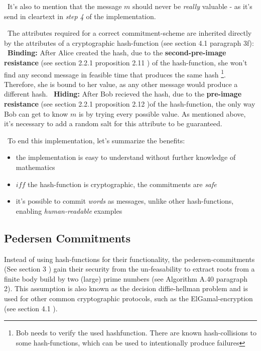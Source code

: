 ~\newline It's also to mention that the message $m$ should never be \textit{really} valuable - as it's send in cleartext in \textit{step 4} of the implementation.  

~\newline The attributes required for a correct commitment-scheme are inherited directly by the attributes of a cryptographic hash-function (see \cite{Mironov05} section 4.1 paragraph 3f): 
~\newline \textbf{Binding:} After Alice created the hash, due to the \textbf{second-pre-image resistance} (see \cite{DeHa15} section 2.2.1 proposition 2.11 ) of the hash-function, she won't find any second message in feasible time that produces the same hash \footnote{Bob needs to verify the used hashfunction. There are known hash-collisions to some hash-functions, which can be used to intentionally produce failures}. Therefore, she is bound to her value, as any other message would produce a different hash.  
~\newline \textbf{Hiding:} After Bob recieved the hash, due to the \textbf{pre-image resistance} (see \cite{DeHa15} section 2.2.1 proposition 2.12 )of the hash-function, the only way Bob can get to know $m$ is by trying every possible value. As mentioned above, it's necessary to add a random salt for this attribute to be guaranteed.

~\newline To end this implementation, let's summarize the benefits: 
\begin{itemize}
	\item the implementation is easy to understand without further knowledge of mathematics
	\item $iff$ the hash-function is cryptographic, the commitments are \textit{safe}
	\item it's possible to commit \textit{words} as messages, unlike other hash-functions, enabling \textit{human-readable} examples  
\end{itemize} 

\subsection{Pedersen Commitments}
Instead of using hash-functions for their functionality, the pedersen-commitments (See \cite{Ped01} section 3 ) gain their security from the un-feasability to extract roots from a finite body build by two (large) prime numbers (see \cite{DeHa15} Algorithm A.40 paragraph 2). This assumption is also known as the decision diffie-hellman problem and is used for other common cryptographic protocols, such as the ElGamal-encryption (see \cite{b1} section 4.1 ). 

